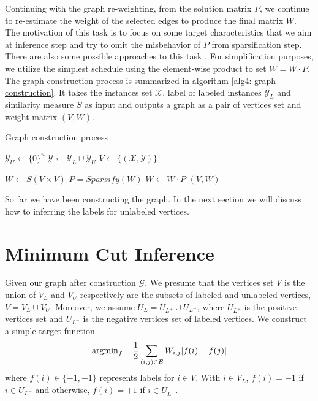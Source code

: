 Continuing with the graph re-weighting, from the solution matrix $P$, we continue to re-estimate the weight of the selected edges to produce the final matrix $W$. The motivation of this task is to focus on some target characteristics that we aim at inference step and try to omit the misbehavior of $P$ from sparsification step. There are also some possible approaches to this task \parencite{Jebara:2009:GCB:1553374.1553432, Subramanya:2014:GSL:2765801}. For simplification purposes, we utilize the simplest schedule using the element-wise product to set $W = W \cdot P$. The graph construction process is summarized in algorithm \ref{alg4: graph construction}. It takes the instances set $\mathcal{X}$, label of labeled instances $\mathcal{Y}_L$ and similarity measure $S$ as input and outputs a graph as a pair of vertices set and weight matrix $(V, W)$.
\begin{algorithm}[H]
	\caption{Graph construction process}
	\begin{algorithmic}[1]
		
		\State $\mathcal{Y}_U \gets \{0\}^u$
		\State $\mathcal{Y} \gets \mathcal{Y}_L \cup \mathcal{Y}_U$
		\State $V \gets \{(\mathcal{X}, \mathcal{Y})\}$
		
		\State $W \gets S(V \times V)$
		\State $P = Sparsify(W)$
		\State $W \gets W \cdot P$
		\RETURN $(V, W)$
		
		\EndFunction
	\end{algorithmic}
	\label{alg4: graph construction}
\end{algorithm}

So far we have been constructing the graph. In the next section we will discuss how to inferring the labels for unlabeled vertices.

\section{Minimum Cut Inference}
\label{section3: mincut approach}

Given our graph after construction $\mathcal{G}$. We presume that the vertices set $V$ is the union of $V_L$ and $V_U$ respectively are the subsets of labeled and unlabeled vertices,  $V = V_L \cup V_U$. Moreover, we assume $U_L = U_{L^+} \cup U_{L^-}$, where $U_{L^+}$ is the positive vertices set and $U_{L^-}$ is the negative vertices set of labeled vertices. We construct a simple target function
\begin{align}
\label{equal4: target function}
\operatorname{argmin}_{f} \quad \frac{1}{2}\sum_{(i,j) \in E}{W_{i,j}|f(i) - f(j)|}
\end{align}
where $f(i) \in \{-1, +1\}$ represents labels for $i \in V$. With $i \in V_L$, $f(i) = -1$ if $i \in U_{L^-}$ and otherwise, $f(i) = +1$ if $i \in U_{L^+}$.

